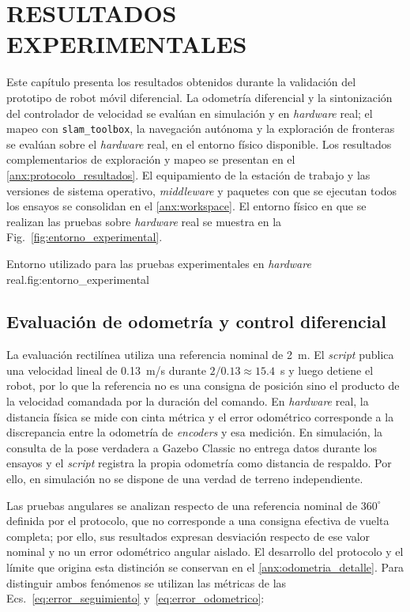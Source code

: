 \chapter{RESULTADOS EXPERIMENTALES}
\label{ch:resultados}

Este capítulo presenta los resultados obtenidos durante la validación del prototipo de robot móvil diferencial. La odometría diferencial y la sintonización del controlador de velocidad se evalúan en simulación y en \textit{hardware} real; el mapeo con \texttt{slam\_toolbox}, la navegación autónoma y la exploración de fronteras se evalúan sobre el \textit{hardware} real, en el entorno físico disponible. Los resultados complementarios de exploración y mapeo se presentan en el \ref{anx:protocolo_resultados}. El equipamiento de la estación de trabajo y las versiones de sistema
operativo, \textit{middleware} y paquetes con que se ejecutan todos los ensayos se
consolidan en el \ref{anx:workspace}. El entorno físico en que se realizan las pruebas sobre \textit{hardware} real se muestra en la Fig.~\ref{fig:entorno_experimental}.

{Entorno utilizado para las pruebas experimentales en \textit{hardware} real.}{fig:entorno_experimental}

\section{Evaluación de odometría y control diferencial}
\label{sec:resultados_odometria}

La evaluación rectilínea utiliza una referencia nominal de 2~m. El \textit{script} publica una velocidad lineal de 0.13~m/s durante $2/0.13\approx15.4$~s y luego detiene el robot, por lo que la referencia no es una consigna de posición sino el producto de la velocidad comandada por la duración del comando. En \textit{hardware} real, la distancia física se mide con cinta métrica y el error odométrico corresponde a la discrepancia entre la odometría de \textit{encoders} y esa medición. En simulación, la consulta de la pose verdadera a Gazebo Classic no entrega datos durante los ensayos y el \textit{script} registra la propia odometría como distancia de respaldo. Por ello, en simulación no se dispone de una verdad de terreno independiente.

Las pruebas angulares se analizan respecto de una referencia nominal de
$360^\circ$ definida por el protocolo, que no corresponde a una consigna
efectiva de vuelta completa; por ello, sus resultados expresan desviación
respecto de ese valor nominal y no un error odométrico angular aislado. El
desarrollo del protocolo y el límite que origina esta distinción se conservan
en el \ref{anx:odometria_detalle}.
Para distinguir ambos fenómenos se utilizan las métricas de las
Ecs.~\eqref{eq:error_seguimiento} y~\eqref{eq:error_odometrico}:

